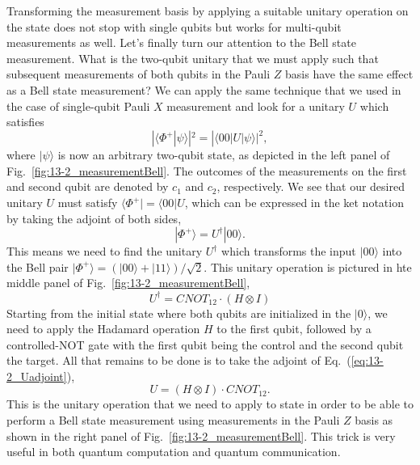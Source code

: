 Transforming the measurement basis by applying a suitable unitary operation on the state does not stop with single qubits but works for multi-qubit measurements as well.
Let's finally turn our attention to the Bell state measurement.
What is the two-qubit unitary that we must apply such that subsequent measurements of both qubits in the Pauli $Z$ basis have the same effect as a Bell state measurement?
We can apply the same technique that we used in the case of single-qubit Pauli $X$ measurement and look for a unitary $U$ which satisfies
\begin{equation}
    |\langle\Phi^+|\psi\rangle|^2 = |\langle00|U|\psi\rangle|^2,
\end{equation}
where $|\psi\rangle$ is now an arbitrary two-qubit state, as depicted in the left panel of Fig.~\ref{fig:13-2_measurementBell}.
The outcomes of the measurements on the first and second qubit are denoted by $c_1$ and $c_2$, respectively.
We see that our desired unitary $U$ must satisfy $\langle\Phi^+| = \langle00|U$, which can be expressed in the ket notation by taking the adjoint of both sides,
\begin{equation}
    |\Phi^+\rangle = U^{\dagger} |00\rangle.
\end{equation}
This means we need to find the unitary $U^{\dagger}$ which transforms the input $|00\rangle$ into the Bell pair $|\Phi^+\rangle = (|00\rangle + |11\rangle) / \sqrt{2}$.
This unitary operation is pictured in hte middle panel of Fig.~\ref{fig:13-2_measurementBell},
\begin{equation}
    U^{\dagger} = CNOT_{12} \cdot (H \otimes I)
    \label{eq:13-2_Uadjoint}
\end{equation}
Starting from the initial state where both qubits are initialized in the $|0\rangle$, we need to apply the Hadamard operation $H$ to the first qubit, followed by a controlled-NOT gate with the first qubit being the control and the second qubit the target.
All that remains to be done is to take the adjoint of Eq.~(\ref{eq:13-2_Uadjoint}),
\begin{equation}
    U = (H \otimes I) \cdot CNOT_{12}.
\end{equation}
This is the unitary operation that we need to apply to state in order to be able to perform a Bell state measurement using measurements in the Pauli $Z$ basis as shown in the right panel of Fig.~\ref{fig:13-2_measurementBell}.
This trick is very useful in both quantum computation and quantum communication.



